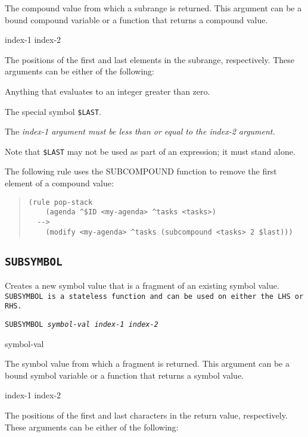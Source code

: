 {{\begin{arguments}
  The compound value from which a subrange is returned. This argument
  can be a bound compound variable or a function that returns a
  compound value.

\item[index-1 index-2]

  The positions of the first and last elements in the subrange,
  respectively. These arguments can be either of the following:
  
  Anything that evaluates to an integer greater than zero.

  The special symbol \verb|$LAST|.

  The \it{index-1} argument must be less than or equal to the
  \it{index-2} argument.

  Note that
  \verb|$LAST| may not be used as part of an expression; it must stand
  alone.
\end{arguments}

\Example

The following rule uses the SUBCOMPOUND function to remove
the first element of a compound value:
\begin{quote}
\begin{verbatim}
(rule pop-stack
    (agenda ^$ID <my-agenda> ^tasks <tasks>)
  -->
    (modify <my-agenda> ^tasks (subcompound <tasks> 2 $last)))
\end{verbatim}
\end{quote}

\subsection{\tt{SUBSYMBOL}}

Creates a new symbol value that is a fragment of an existing symbol
value. \tt{SUBSYMBOL} is a stateless function and can be used on
either the LHS or RHS.

\Format

\tt{SUBSYMBOL} \it{symbol-val} \it{index-1} \it{index-2}

\begin{arguments}
\item[symbol-val]

  The symbol value from which a fragment is returned. This argument
  can be a bound symbol variable or a function that returns a symbol
  value.

\item[index-1 index-2]

  The positions of the first and last characters in the return value,
  respectively. These arguments can be either of the following:


\end{arguments}}}
